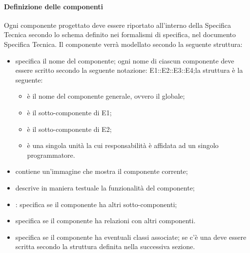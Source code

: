 \paragraph{Definizione delle componenti}
\label{}
Ogni componente progettato deve essere riportato all'interno della Specifica Tecnica secondo lo schema definito nei formalismi di specifica, nel documento Specifica Tecnica. Il componente verrà modellato secondo la seguente struttura:
\begin{itemize}
\item {}specifica il nome del componente; ogni nome di ciascun componente deve essere scritto secondo la seguente notazione: E1::E2::E3::E4;la struttura è la seguente:
\begin{itemize}
\item {}è il nome del componente generale, ovvero il  globale;
\item {}è il sotto-componente di E1;
\item {}è il sotto-componente di E2;
\item {}è una singola unità la cui responsabilità è affidata ad un singolo programmatore.
\end{itemize}
\item {}contiene un'immagine che mostra il componente corrente;
\item {}descrive in maniera testuale la funzionalità del componente;
\item {}: specifica se il componente ha altri sotto-componenti;
\item {} specifica se il componente ha relazioni con altri componenti.
\item {}specifica se il componente ha eventuali classi associate; se c'è una  deve essere scritta secondo la struttura definita nella successiva sezione.
\end{itemize}

